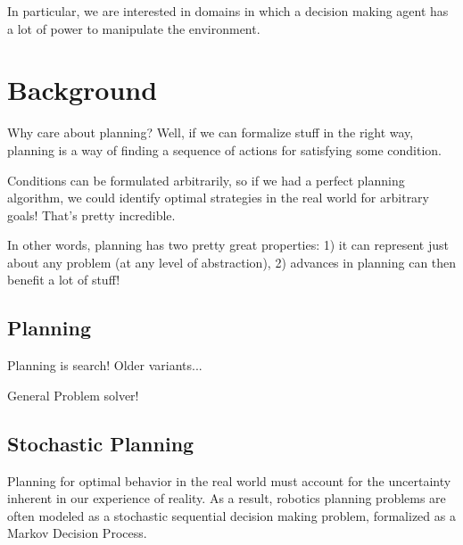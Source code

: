 \documentclass[11pt]{article}
\begin{document}
In particular, we are interested in domains in which a decision making agent has a lot of power to manipulate the environment.



\section{Background}
\label{sec:background}

Why care about planning? Well, if we can formalize stuff in the right way, planning is a way of finding a sequence of actions for satisfying some condition.

Conditions can be formulated arbitrarily, so if we had a perfect planning algorithm, we could identify optimal strategies in the real world for arbitrary goals! That's pretty incredible.

In other words, planning has two pretty great properties: 1) it can represent just about any problem (at any level of abstraction), 2) advances in planning can then benefit a lot of stuff!

\subsection{Planning}

Planning is search! Older variants...

General Problem solver!

\subsection{Stochastic Planning}

Planning for optimal behavior in the real world must account for the uncertainty inherent in our experience of reality. As a result, robotics planning problems are often modeled as a stochastic sequential decision making problem, formalized as a Markov Decision Process.
\end{document}
